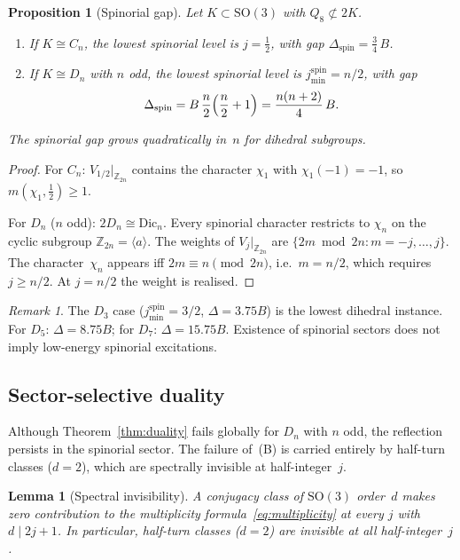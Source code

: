 \documentclass[12pt]{article}
\newtheorem{lemma}[theorem]{Lemma}
\newtheorem{proposition}[theorem]{Proposition}
\theoremstyle{definition}
\theoremstyle{remark}
\newtheorem{remark}[theorem]{Remark}
\newcommand{\ZZ}{\mathbb{Z}}
\newcommand{\SO}{\mathrm{SO}}
\begin{document}
\begin{proposition}[Spinorial gap]
  \label{prop:spinorial-gap}
  Let $K \subset \SO(3)$ with $Q_8 \not\subset 2K$.
  \begin{enumerate}
  \item If $K \cong C_n$, the lowest spinorial level is
    $j = \tfrac{1}{2}$, with gap
    $\Delta_{\mathrm{spin}} = \tfrac{3}{4}\,B$.
  \item If $K \cong D_n$ with $n$ odd, the lowest spinorial
    level is $j_{\min}^{\mathrm{spin}} = n/2$, with gap
    \[
      \Delta_{\mathrm{spin}}
      = B\,\frac{n}{2}\Bigl(\frac{n}{2}+1\Bigr)
      = \frac{n(n+2)}{4}\,B.
    \]
  \end{enumerate}
  The spinorial gap grows quadratically
  in~$n$ for dihedral subgroups.
\end{proposition}

\begin{proof}
  For $C_n$: $V_{1/2}|_{\ZZ_{2n}}$ contains the character
  $\chi_1$ with $\chi_1(-1) = -1$, so $m(\chi_1, \tfrac{1}{2}) \geq 1$.

  For $D_n$ ($n$ odd): $2D_n \cong \mathrm{Dic}_n$.
  Every spinorial character restricts to $\chi_n$ on the
  cyclic subgroup $\ZZ_{2n} = \langle a \rangle$.
  The weights of $V_j|_{\ZZ_{2n}}$ are
  $\{2m \bmod 2n : m = -j, \ldots, j\}$.
  The character~$\chi_n$ appears iff $2m \equiv n \pmod{2n}$,
  i.e.\ $m = n/2$, which requires $j \geq n/2$.
  At $j = n/2$ the weight is realised.
\end{proof}

\begin{remark}
  The $D_3$ case ($j_{\min}^{\mathrm{spin}} = 3/2$,
  $\Delta = 3.75B$) is the lowest dihedral instance.
  For $D_5$: $\Delta = 8.75B$; for $D_7$: $\Delta = 15.75B$.
  Existence of spinorial sectors does not imply
  low-energy spinorial excitations.
\end{remark}

\subsection{Sector-selective duality}
\label{sec:sector-selective}

Although Theorem~\ref{thm:duality} fails globally for $D_n$
with $n$ odd, the reflection persists in the spinorial sector.
The failure of~(B) is carried entirely by half-turn classes
($d = 2$), which are spectrally invisible at half-integer~$j$.

\begin{lemma}[Spectral invisibility]
  \label{lem:invisibility}
  A conjugacy class of $\SO(3)$ order~$d$ makes zero contribution
  to the multiplicity formula~\eqref{eq:multiplicity}
  at every $j$ with $d \mid 2j{+}1$.
  In particular, half-turn classes ($d = 2$) are invisible
  at all half-integer~$j$.
\end{lemma}
\end{document}
